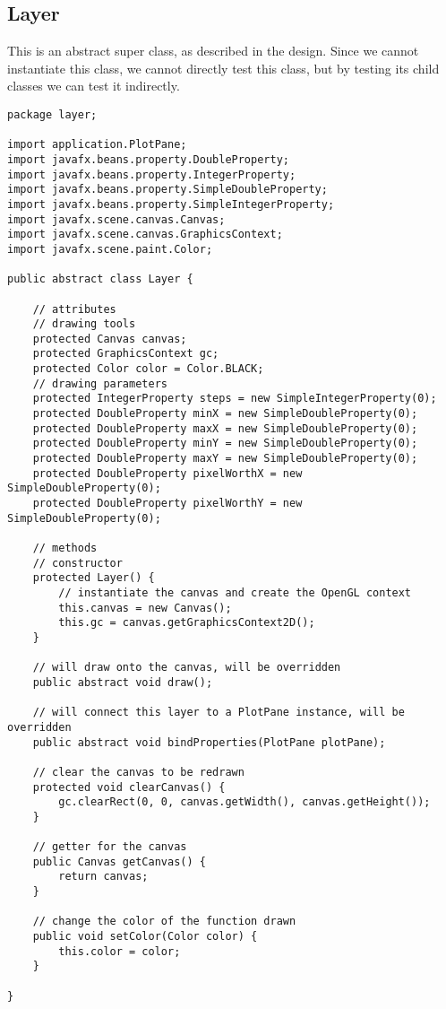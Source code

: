 \documentclass[../../../../main.tex]{subfiles}
\begin{document}
\subsection{Layer}
This is an abstract super class, as described in the design. Since we cannot instantiate this class, we cannot directly test this class, but by testing its child classes we can test it indirectly.
\begin{verbatim}
package layer;

import application.PlotPane;
import javafx.beans.property.DoubleProperty;
import javafx.beans.property.IntegerProperty;
import javafx.beans.property.SimpleDoubleProperty;
import javafx.beans.property.SimpleIntegerProperty;
import javafx.scene.canvas.Canvas;
import javafx.scene.canvas.GraphicsContext;
import javafx.scene.paint.Color;

public abstract class Layer {

	// attributes
	// drawing tools
	protected Canvas canvas;
	protected GraphicsContext gc;
	protected Color color = Color.BLACK;
	// drawing parameters
	protected IntegerProperty steps = new SimpleIntegerProperty(0);
	protected DoubleProperty minX = new SimpleDoubleProperty(0);
	protected DoubleProperty maxX = new SimpleDoubleProperty(0);
	protected DoubleProperty minY = new SimpleDoubleProperty(0);
	protected DoubleProperty maxY = new SimpleDoubleProperty(0);
	protected DoubleProperty pixelWorthX = new SimpleDoubleProperty(0);
	protected DoubleProperty pixelWorthY = new SimpleDoubleProperty(0);

	// methods
	// constructor
	protected Layer() {
		// instantiate the canvas and create the OpenGL context
		this.canvas = new Canvas();
		this.gc = canvas.getGraphicsContext2D();
	}

	// will draw onto the canvas, will be overridden
	public abstract void draw();

	// will connect this layer to a PlotPane instance, will be overridden
	public abstract void bindProperties(PlotPane plotPane);

	// clear the canvas to be redrawn
	protected void clearCanvas() {
		gc.clearRect(0, 0, canvas.getWidth(), canvas.getHeight());
	}

	// getter for the canvas
	public Canvas getCanvas() {
		return canvas;
	}

	// change the color of the function drawn
	public void setColor(Color color) {
		this.color = color;
	}

}
\end{verbatim}
\newpage
\end{document}
